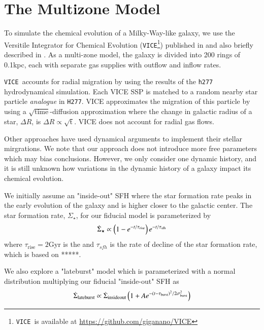 \documentclass[12pt,oneside]{book}
\newcommand{\VICE}{\texttt{VICE}}
\begin{document}
\chapter{The Multizone Model}\label{sec:vice}

To simulate the chemical evolution of a Milky-Way-like galaxy, we use the Versitile Integrator for Chemical Evolution (\VICE\footnote{\VICE~is available at \url{https://github.com/giganano/VICE}}) published in \citet{james+21} and also briefly described in \citet{james+22}.  As a multi-zone model, the galaxy is divided into 200 rings of 0.1kpc, each with separate gas supplies with outflow and inflow rates. 


\VICE\ accounts for radial migration by using the results of the \texttt{h277} hydrodynamical simulation. Each VICE SSP is matched to a random nearby star particle \textit{analogue} in \texttt{H277}. VICE approximates the migration of this particle by using a $\sqrt{\text{time}}$-diffusion approximation where the change in galactic radius of a star, $\Delta R$, is $\Delta R \propto \sqrt{\text{t}}$. 
VICE does not account for radial gas flows. 

Other approaches have used dynamical arguments to implement their stellar mirgrations. We note that our approach does not introduce more free parameters which may bias conclusions. However, we only consider one dynamic history, and it is still unknown how variations in the dynamic history of a galaxy impact its chemical evolution.


We initially assume an "inside-out" SFH where the star formation rate peaks in the early evolution of the galaxy and is higher closer to the galactic center. The star formation rate, $\Sigma_\star$, for our fiducial model is parameterized by
\begin{equation}
    \dot{\Sigma}_\star \propto \left(1-e^{-t/\tau_{\rm rise}}\right) e^{-t/\tau_{\rm sfh}}
\end{equation}
where $\tau_\text{rise}=2$Gyr is the
and $\tau_{sfh}$ is the rate of decline of the star formation rate, which is based on *****.

We also explore a "lateburst" model which is parameterized with a normal distribution multiplying our fiducial "inside-out" SFH as
\begin{equation}\label{eq:lateburst}
    \dot{\Sigma}_{\rm lateburst} \propto \dot{\Sigma}_{\rm insideout} \left(1 + A e^{-(t-\tau_{\rm burst})^2/2\sigma^2_{\rm burst}} \right)
\end{equation}
\end{document}
